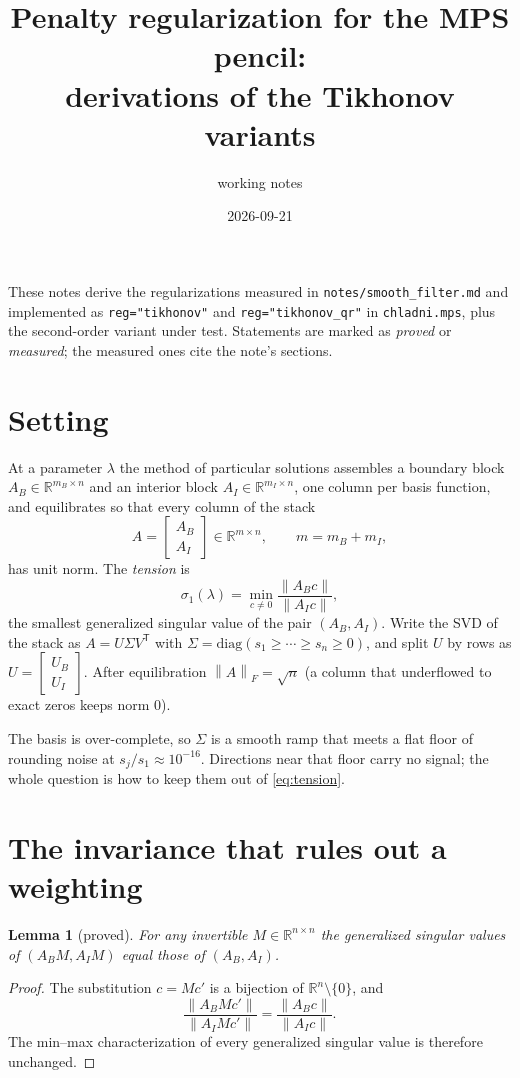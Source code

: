\documentclass[11pt]{article}
\title{Penalty regularization for the MPS pencil:\\ derivations of the Tikhonov variants}
\author{\code{chladni} working notes}
\date{2026-09-21}
\newtheorem{lemma}{Lemma}
\theoremstyle{definition}
\theoremstyle{remark}
\newcommand{\code}[1]{\texttt{#1}}
\newcommand{\R}{\mathbb{R}}
\newcommand{\lam}{\lambda}
\newcommand{\sig}{\sigma}
\newcommand{\norm}[1]{\left\lVert #1 \right\rVert}
\newcommand{\AB}{A_B}
\newcommand{\AI}{A_I}
\begin{document}
\maketitle

\noindent These notes derive the regularizations measured in \code{notes/smooth\_filter.md}
and implemented as \code{reg="tikhonov"} and \code{reg="tikhonov\_qr"} in
\code{chladni.mps}, plus the second-order variant under test. Statements are marked as
\emph{proved} or \emph{measured}; the measured ones cite the note's sections.

\section{Setting}

At a parameter $\lam$ the method of particular solutions assembles a boundary block
$\AB \in \R^{m_B\times n}$ and an interior block $\AI \in \R^{m_I\times n}$, one column per basis
function, and equilibrates so that every column of the stack
\[
  A = \begin{bmatrix}\AB\\ \AI\end{bmatrix} \in \R^{m\times n}, \qquad m = m_B + m_I,
\]
has unit norm. The \emph{tension} is
\begin{equation}\label{eq:tension}
  \sig_1(\lam) = \min_{c\neq 0} \frac{\norm{\AB c}}{\norm{\AI c}},
\end{equation}
the smallest generalized singular value of the pair $(\AB,\AI)$. Write the SVD of the stack as
$A = U\Sigma V^{\mathsf T}$ with $\Sigma = \mathrm{diag}(s_1\ge\cdots\ge s_n\ge 0)$, and split
$U$ by rows as $U = \begin{bmatrix}U_B\\ U_I\end{bmatrix}$. After equilibration
$\norm{A}_F = \sqrt{n}$ (a column that underflowed to exact zeros keeps norm $0$).

The basis is over-complete, so $\Sigma$ is a smooth ramp that meets a flat floor of rounding
noise at $s_j/s_1 \approx 10^{-16}$. Directions near that floor carry no signal; the whole
question is how to keep them out of \eqref{eq:tension}.

\section{The invariance that rules out a weighting}

\begin{lemma}[proved]\label{lem:invariance}
For any invertible $M\in\R^{n\times n}$ the generalized singular values of $(\AB M,\AI M)$ equal
those of $(\AB,\AI)$.
\end{lemma}
\begin{proof}
The substitution $c = Mc'$ is a bijection of $\R^n\setminus\{0\}$, and
\[
  \frac{\norm{\AB M c'}}{\norm{\AI M c'}} = \frac{\norm{\AB c}}{\norm{\AI c}}.
\]
The min--max characterization of every generalized singular value is therefore unchanged.
\end{proof}
\end{document}
